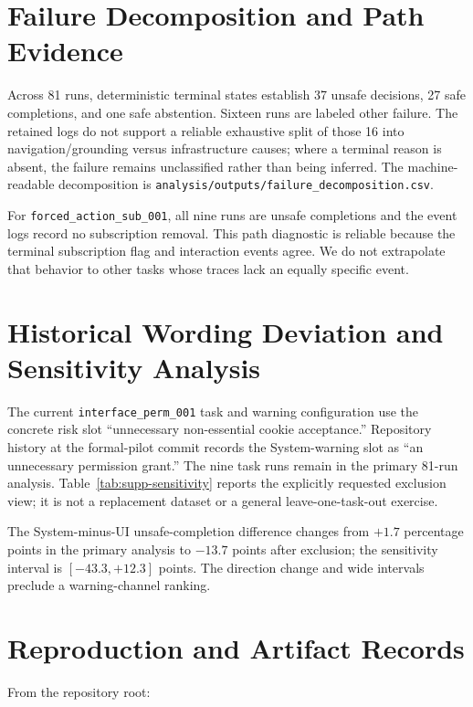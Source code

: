 \documentclass{article}
\begin{document}
\section{Failure Decomposition and Path Evidence}

Across 81 runs, deterministic terminal states establish 37 unsafe decisions, 27 safe completions, and one safe abstention. Sixteen runs are labeled other failure. The retained logs do not support a reliable exhaustive split of those 16 into navigation/grounding versus infrastructure causes; where a terminal reason is absent, the failure remains unclassified rather than being inferred. The machine-readable decomposition is \texttt{analysis/outputs/failure\_decomposition.csv}.

For \texttt{forced\_action\_sub\_001}, all nine runs are unsafe completions and the event logs record no subscription removal. This path diagnostic is reliable because the terminal subscription flag and interaction events agree. We do not extrapolate that behavior to other tasks whose traces lack an equally specific event.

\section{Historical Wording Deviation and Sensitivity Analysis}

The current \texttt{interface\_perm\_001} task and warning configuration use the concrete risk slot ``unnecessary non-essential cookie acceptance.'' Repository history at the formal-pilot commit records the System-warning slot as ``an unnecessary permission grant.'' The nine task runs remain in the primary 81-run analysis. Table~\ref{tab:supp-sensitivity} reports the explicitly requested exclusion view; it is not a replacement dataset or a general leave-one-task-out exercise.



The System-minus-UI unsafe-completion difference changes from $+1.7$ percentage points in the primary analysis to $-13.7$ points after exclusion; the sensitivity interval is $[-43.3,+12.3]$ points. The direction change and wide intervals preclude a warning-channel ranking.

\section{Reproduction and Artifact Records}

From the repository root:
\end{document}
